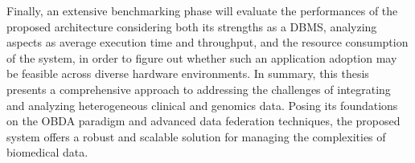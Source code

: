 Finally, an extensive benchmarking phase will evaluate the performances of the proposed architecture considering both its strengths as a \ac{DBMS}, analyzing aspects as average execution time and throughput, and the resource consumption of the system, in order to figure out whether such an application adoption may be feasible across diverse hardware environments.
In summary, this thesis presents a comprehensive approach to addressing the challenges of integrating and analyzing heterogeneous clinical and genomics data. Posing its foundations on the \ac{OBDA} paradigm and advanced data federation techniques, the proposed system offers a robust and scalable solution for managing the complexities of biomedical data.
